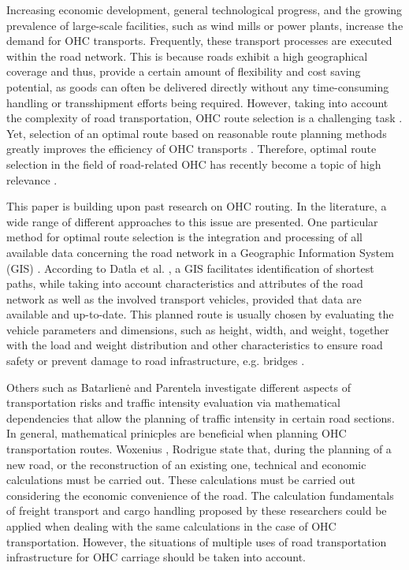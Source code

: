 %

Increasing economic development, general technological progress, and the growing prevalence of large-scale facilities, such as wind mills or power plants, increase the demand for OHC transports.
Frequently, these transport processes are executed within the road network. This is because roads exhibit a high geographical coverage and thus, provide a certain amount of flexibility and cost saving potential, as goods can often be delivered directly without any time-consuming handling or transshipment efforts being required. However, taking into account the complexity of road transportation, OHC route selection is a challenging task \cite{Bazaras.2013, xu2001methodology, sivilevicius2007dynamics}.
Yet, selection of an optimal route based on reasonable route planning methods greatly improves the efficiency of OHC transports \cite{meng2015optimized}.
Therefore, optimal route selection in the field of road-related OHC has recently become a topic of high relevance \cite{geisberger2011efficient}.
\par
This paper is building upon past research on OHC routing. In the literature, a wide range of different approaches to this issue are presented.
One particular method for optimal route selection is the integration and processing of all available data concerning the road network in a Geographic Information System (GIS) \cite{durham2002gis}.
According to Datla et al. \cite{datla2004gis}, a GIS facilitates identification of shortest paths, while taking into account characteristics and attributes of the road network as well as the involved transport vehicles, provided that data are available and up-to-date. This planned route is usually chosen by evaluating the vehicle parameters and dimensions, such as height, width, and weight, together with the load and weight distribution and other characteristics to ensure road safety or prevent damage to road infrastructure, e.g. bridges \cite{ecmt2006improving, vaitkus2016effect, kombe2017modelling, pauer2017development}.
\par Others such as Batarlienė \cite{batarliene2007mobile} and Parentela \cite{parentela2002risk} investigate different aspects of transportation risks and traffic intensity evaluation via mathematical dependencies that allow the planning of traffic intensity in certain road sections.
In general, mathematical prinicples are beneficial when planning OHC transportation routes.
Woxenius \cite{woxenius2002organisation, woxenius2002conceptual}, Rodrigue \cite{rodrigue2020geography} state that, during the planning of a new road, or the reconstruction of an existing one, technical and economic calculations must be carried out.
These calculations must be carried out considering the economic convenience of the road.
The calculation fundamentals of freight transport and cargo handling proposed by these researchers could be applied when dealing with the same calculations in the case of OHC transportation. However, the situations of multiple uses of road transportation infrastructure for OHC carriage should be taken into account.


